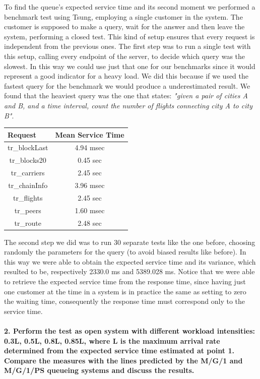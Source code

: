 \documentclass[11pt]{scrartcl} %
\begin{document}
To find the queue's expected service time and its second moment we performed a benchmark test using Tsung, employing a single customer in the system. The customer is supposed to make a query, wait for the answer and then leave the system, performing a closed test. This kind of setup ensures that every request is independent from the previous ones. 
The first step was to run a single test with this setup, calling every endpoint of the server, to decide which query was the slowest. In this way we could use just that one for our benchmarks since it would represent a good indicator for a heavy load.
We did this because if we used the fastest query for the benchmark we would produce a underestimated result. We found that the heaviest query was the one that states: \textit{"given a pair of cities A and B, and a time interval, count the number of flights connecting city A to city B"}.\\

\begin{table}[H]
\centering
\begin{tabular}{c|c}
\multicolumn{1}{l|}{Request} & \multicolumn{1}{l}{Mean Service Time} \\ \hline
tr\_blockLast & 4.94 msec \\
tr\_blocks20 & 0.45 sec \\
tr\_carriers & 2.45 sec \\
tr\_chainInfo & 3.96 msec \\
tr\_flights & 2.45 sec \\
tr\_peers & 1.60 msec \\
tr\_route & 2.48 sec \\
\end{tabular}
\end{table}

The second step we did was to run 30 separate tests like the one before, choosing randomly the parameters for the query (to avoid biased results like before). In this way we were able to obtain the expected service time and its variance, which resulted to be, respectively 2330.0 ms and 5389.028 ms.
Notice that we were able to retrieve the expected service time from the response time, since having just one customer at the time in a system is in practice the same as setting to zero the waiting time, consequently the response time must correspond only to the service time.

\paragraph*{2. Perform the test as open system with different workload intensities: 0.3L, 0.5L, 0.8L, 0.85L, where L is the maximum arrival rate determined from the expected service time estimated at point 1. Compare the measures with the lines predicted by the M/G/1 and M/G/1/PS queueing systems and discuss the results.} \mbox{}\\\\
\end{document}
